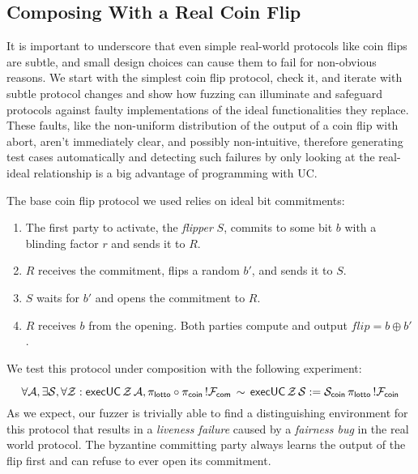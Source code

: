\subsection{Composing With a Real Coin Flip}
It is important to underscore that even simple real-world protocols like coin flips are subtle, and small design choices can cause them to fail for non-obvious reasons.
We start with the simplest coin flip protocol, check it, and iterate with subtle protocol changes and show how fuzzing can illuminate and safeguard protocols against faulty implementations of the ideal functionalities they replace. 
These faults, like the non-uniform distribution of the output of a coin flip with abort, aren't immediately clear, and possibly non-intuitive, therefore generating test cases automatically and detecting such failures by only looking at the real-ideal relationship is a big advantage of programming with UC.

The base coin flip protocol we used relies on ideal bit commitments:
\begin{enumerate}
\item The first party to activate, the \emph{flipper} $S$, commits to some bit $b$ with a blinding factor $r$ and sends it to $R$.
\item $R$ receives the commitment, flips a random $b'$, and sends it to $S$.
\item $S$ waits for $b'$ and opens the commitment to $R$.
\item $R$ receives $b$ from the opening. Both parties compute and output $flip = b \oplus b'$.
\end{enumerate}

We test this protocol under composition with the following experiment:

$$\forall \mathcal{A}, \exists \mathcal{S}, \forall \mathcal{Z}: {\mathsf {execUC}} \, \mathcal{Z} \, \mathcal{A}, \pi_{{\mathsf {lotto}}} \circ \pi_{{\mathsf {coin}}} \, !\mathcal{F}_{{\mathsf {com}}} \, \sim \, {\mathsf {execUC}} \, \mathcal{Z} \, \mathcal{S} := \mathcal{S}_{{\mathsf {coin}}} \, \pi_{{\mathsf {lotto}}} \, !\mathcal{F}_{{\mathsf {coin}}}$$
As we expect, our fuzzer is trivially able to find a distinguishing environment for this protocol that results in a \emph{liveness failure} caused by a \emph{fairness bug} in the real world protocol. 
The byzantine committing party always learns the output of the flip first and can refuse to ever open its commitment.

